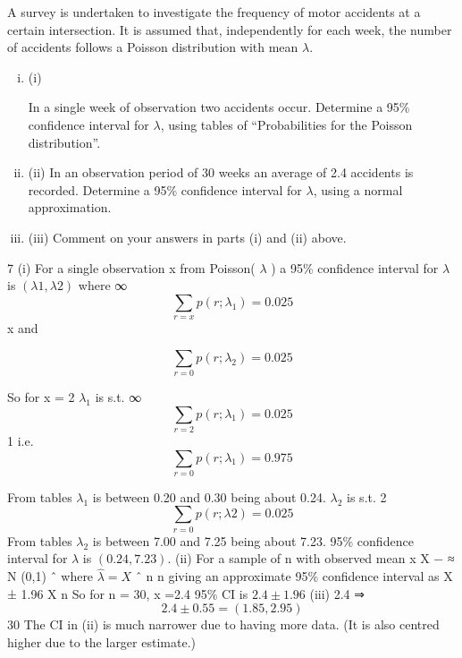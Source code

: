 \documentclass[a4paper,12pt]{article}
\begin{document}
A survey is undertaken to investigate the frequency of motor accidents at a certain intersection.
It is assumed that, independently for each week, the number of accidents follows a Poisson distribution with mean $\lambda$.
\begin{enumerate}[(i)]
\item (i)

In a single week of observation two accidents occur. Determine a 95\% confidence interval for $\lambda$, using tables of “Probabilities for the Poisson distribution”.
\item 
(ii) In an observation period of 30 weeks an average of 2.4 accidents is recorded.
Determine a 95\% confidence interval for $\lambda$, using a normal approximation. 
\item (iii) Comment on your answers in parts (i) and (ii) above.
\end{enumerate}
\item 


7
(i)
For a single observation x from Poisson( $\lambda$ ) a 95\% confidence interval for $\lambda$ is
$( \lambda 1 , \lambda 2 )$ where
∞
\[\sum_{r = x} p ( r ; \lambda_1 ) = 0.025\]
x
and

\[\sum_{r = 0} p ( r ; \lambda_2 ) = 0.025\]

So for x = 2
$\lambda_1$ is s.t.
∞
\[\sum_{r = 2} p ( r ; \lambda_1 ) = 0.025 \]
1
i.e.
\[\sum_{r = 0} p ( r ; \lambda_1 ) = 0.975\]

From tables $\lambda_1$ is between 0.20 and 0.30 being about 0.24.
$\lambda_2$ is s.t.
2
\[\sum_{r = 0} p ( r ; \lambda 2 ) = 0.025\]
\smallskip
From tables $\lambda_2$ is between 7.00 and 7.25 being about 7.23.
95\% confidence interval for $\lambda$ is $(0.24, 7.23)$.
(ii)
For a sample of n with observed mean x
X −\lambda
≈ N (0,1)
ˆ \lambda
where $\hat{\lambda}= X$
ˆ
n \lambda
n
giving an approximate 95\% confidence interval as X ± 1.96
X
n
So for n = 30, x =2.4
95\% CI is $2.4 \pm 1.96 $
(iii)
2.4
⇒ 
\[2.4 \pm 0.55 = (1.85, 2.95)\]
30
The CI in (ii) is much narrower due to having more data.
(It is also centred higher due to the larger estimate.)
\end{document}
